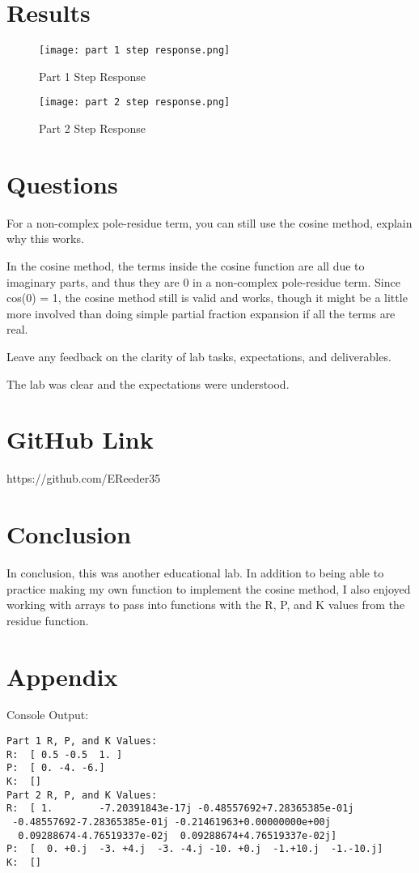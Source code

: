\documentclass[12pt]{article}
\begin{document}
\newpage

\section{Results}

\begin{figure}[h!]
    \centering
    \texttt{[image: part 1 step response.png]}
    \caption{Part 1 Step Response}
\end{figure}

\begin{figure}[h!]
    \centering
    \texttt{[image: part 2 step response.png]}
    \caption{Part 2 Step Response}
\end{figure}

\newpage

\section{Questions}

For a non-complex pole-residue term, you can still use the cosine method, explain why this works.

In the cosine method, the terms inside the cosine function are all due to imaginary parts, and thus they are 0 in a non-complex pole-residue term. Since cos(0) = 1, the cosine method still is valid and works, though it might be a little more involved than doing simple partial fraction expansion if all the terms are real.

Leave any feedback on the clarity of lab tasks, expectations, and deliverables.

The lab was clear and the expectations were understood.

\section{GitHub Link}

https://github.com/EReeder35

\section{Conclusion}

In conclusion, this was another educational lab. In addition to being able to practice making my own function to implement the cosine method, I also enjoyed working with arrays to pass into functions with the R, P, and K values from the residue function.

\newpage

\section{Appendix}

Console Output:

\begin{lstlisting}
Part 1 R, P, and K Values:
R:  [ 0.5 -0.5  1. ]
P:  [ 0. -4. -6.]
K:  []
Part 2 R, P, and K Values:
R:  [ 1.        -7.20391843e-17j -0.48557692+7.28365385e-01j
 -0.48557692-7.28365385e-01j -0.21461963+0.00000000e+00j
  0.09288674-4.76519337e-02j  0.09288674+4.76519337e-02j]
P:  [  0. +0.j  -3. +4.j  -3. -4.j -10. +0.j  -1.+10.j  -1.-10.j]
K:  []
\end{lstlisting}
\end{document}
